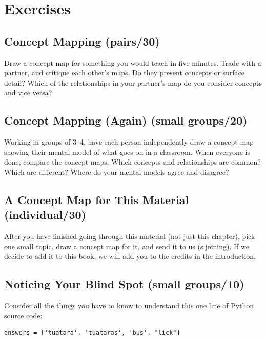 \section{Exercises}\label{s:memory-exercises}

\subsection{Concept Mapping (pairs/30)}\label{concept-mapping-pairs30}

Draw a concept map for something you would teach in five minutes. Trade
with a partner, and critique each other's maps. Do they present concepts
or surface detail? Which of the relationships in your partner's map do
you consider concepts and vice versa?

\subsection{Concept Mapping (Again) (small groups/20)}\label{concept-mapping-again-small-groups20}

Working in groups of 3--4, have each person independently draw a concept
map showing their mental model of what goes on in a classroom. When
everyone is done, compare the concept maps. Which concepts and
relationships are common? Which are different? Where do your mental
models agree and disagree?

\subsection{A Concept Map for This Material (individual/30)}\label{a-concept-map-for-this-material-individual30}

After you have finished going through this material (not just this
chapter), pick one small topic, draw a concept map for it, and send it
to us (\protect\hyperlink{APPENDIX}{s:joining}). If we decide to add it to this book, we
will add you to the credits in the introduction.

\subsection{Noticing Your Blind Spot (small groups/10)}\label{noticing-your-blind-spot-small-groups10}

Consider all the things you have to know to understand this one line of
Python source code:

\begin{lstlisting}
answers = ['tuatara', 'tuataras', 'bus', "lick"]
\end{lstlisting}

